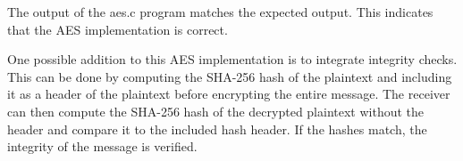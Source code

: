 The output of the aes.c program matches the expected output. 
This indicates that the AES implementation is correct.

One possible addition to this AES implementation is to integrate integrity checks.
This can be done by computing the SHA-256 hash of the plaintext and including it
as a header of the plaintext before encrypting the entire message. 
The receiver can then compute the SHA-256 hash of
the decrypted plaintext without the header and compare it to the included hash header.
If the hashes match, the integrity of the message is verified.